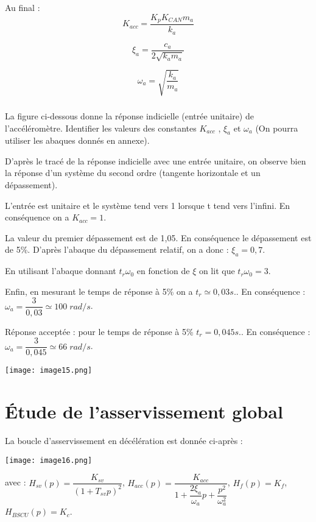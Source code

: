 \begin{multicols}{2}
\begin{corrige}
Au final : 
$$
K_{acc} = \dfrac{K_p K_{CAN} m_a}{k_a}
$$

$$
\xi_a = \dfrac{c_a}{2\sqrt{k_a m_a}}
$$

$$
\omega_a = \sqrt{\dfrac{k_a}{m_a}}
$$
\end{corrige}
\else
\fi

\subparagraph{}
La figure ci-dessous donne la réponse indicielle (entrée unitaire) de l'accéléromètre.
Identifier les valeurs des constantes $K_{acc}$ , $\xi_a$ et $\omega_a$ (On pourra utiliser les abaques donnés en annexe).
\ifprof
\begin{corrige}
D'après le tracé de la réponse indicielle avec une entrée unitaire, on observe
bien la réponse d'un système du second ordre (tangente horizontale et un
dépassement).

L'entrée est unitaire et le système tend vers 1 lorsque t tend vers l'infini.
En conséquence on a $K_{acc}=1$.

La valeur du premier dépassement est de 1,05. En conséquence le dépassement est
de 5\%. D'après l'abaque du dépassement relatif, on a donc : $\xi_a=0,7$. 

En utilisant l'abaque donnant $t_r \omega_0$ en fonction de $\xi$ on lit que 
$t_r \omega_0 = 3$. 


Enfin, en mesurant le temps de réponse à 5\% on a $t_r \simeq 0,03 s.$. En
conséquence : $\omega_a = \dfrac{3}{0,03}\simeq 100 \; rad/s$.

Réponse acceptée : pour le temps de réponse à 5\% $t_r = 0,045 s.$. En
conséquence : $\omega_a = \dfrac{3}{0,045}\simeq 66\;  rad/s$.

\end{corrige}
\else
\fi



\ifprof
\else
\begin{center}
\texttt{[image: image15.png]}
\end{center}
\fi

\section*{Étude de l'asservissement global}
\ifprof
\else
La boucle d'asservissement en décélération est donnée ci-après :

\begin{center}
\texttt{[image: image16.png]}
\end{center}

avec : 
$H_{sv} (p)=\dfrac{K_{sv}}{\left(1+T_{sv} p\right)^2}$, 
$H_{acc}(p)=\dfrac{K_{acc}}{1+\dfrac{2\xi_a }{\omega_a}p+\dfrac{p^2}{\omega_a^2}}$, 
$H_f(p)=K_f$, 
$H_{BSCU}(p)=K_c$.
\fi


\end{multicols}
